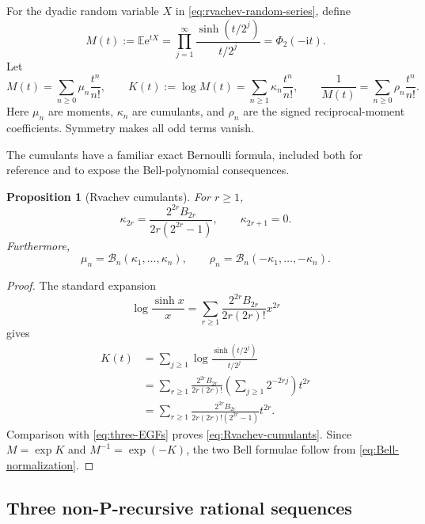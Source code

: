 \documentclass[11pt]{article}
\numberwithin{equation}{section}
\newtheorem{proposition}[theorem]{Proposition}
\theoremstyle{definition}
\theoremstyle{remark}
\newcommand{\E}{\mathbb E}
\newcommand{\ii}{\mathrm i}
\newcommand{\e}{\mathrm e}
\newcommand{\Bell}{\mathcal B}
\begin{document}
For the dyadic random variable $X$ in \eqref{eq:rvachev-random-series}, define
\begin{equation}
 M(t):=\E\e^{tX}
 =\prod_{j=1}^{\infty}
 \frac{\sinh(t/2^j)}{t/2^j}
 =\Phi_2(-\ii t).
 \label{eq:MGF}
\end{equation}
Let
\begin{equation}
 M(t)=\sum_{n\ge0}\mu_n\frac{t^n}{n!},
 \qquad
 K(t):=\log M(t)=\sum_{n\ge1}\kappa_n\frac{t^n}{n!},
 \qquad
 \frac1{M(t)}=\sum_{n\ge0}\rho_n\frac{t^n}{n!}.
 \label{eq:three-EGFs}
\end{equation}
Here $\mu_n$ are moments, $\kappa_n$ are cumulants, and $\rho_n$ are the
signed reciprocal-moment coefficients.  Symmetry makes all odd terms vanish.

The cumulants have a familiar exact Bernoulli formula, included both for
reference and to expose the Bell-polynomial consequences.

\begin{proposition}[Rvachev cumulants]
\label{prop:Rvachev-cumulants}
For $r\ge1$,
\begin{equation}
 \boxed{
 \kappa_{2r}=
 \frac{2^{2r}B_{2r}}{2r(2^{2r}-1)},
 \qquad \kappa_{2r+1}=0.}
 \label{eq:Rvachev-cumulants}
\end{equation}
Furthermore,
\begin{equation}
 \mu_n=\Bell_n(\kappa_1,\ldots,\kappa_n),
 \qquad
 \rho_n=\Bell_n(-\kappa_1,\ldots,-\kappa_n).
 \label{eq:moment-Bell}
\end{equation}
\end{proposition}
\begin{proof}
The standard expansion
\begin{equation}
 \log\frac{\sinh x}{x}
 =\sum_{r\ge1}
 \frac{2^{2r}B_{2r}}{2r(2r)!}x^{2r}
 \label{eq:logsinh-expansion}
\end{equation}
gives
\begin{align*}
 K(t)
 &=\sum_{j\ge1}\log\frac{\sinh(t/2^j)}{t/2^j}\\
 &=\sum_{r\ge1}
 \frac{2^{2r}B_{2r}}{2r(2r)!}
 \left(\sum_{j\ge1}2^{-2rj}\right)t^{2r}\\
 &=\sum_{r\ge1}
 \frac{2^{2r}B_{2r}}{2r(2r)!(2^{2r}-1)}t^{2r}.
\end{align*}
Comparison with \eqref{eq:three-EGFs} proves
\eqref{eq:Rvachev-cumulants}.  Since $M=\exp K$ and $M^{-1}=\exp(-K)$,
the two Bell formulae follow from \eqref{eq:Bell-normalization}.
\end{proof}

\subsection{Three non-P-recursive rational sequences}
\end{document}
